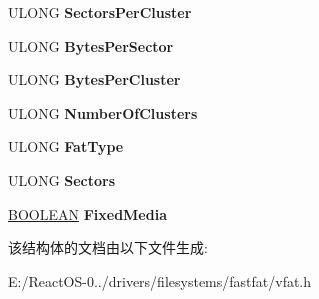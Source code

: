 \begin{DoxyCompactItemize}
\item 
\mbox{\label{struct_f_a_t_i_n_f_o_ac29036db23fe1c0f4ef92f9d8b02137f}} 
U\+L\+O\+NG {\bfseries Sectors\+Per\+Cluster}
\item 
\mbox{\label{struct_f_a_t_i_n_f_o_a7ca6b8360610f1c316be03724b19ccae}} 
U\+L\+O\+NG {\bfseries Bytes\+Per\+Sector}
\item 
\mbox{\label{struct_f_a_t_i_n_f_o_aa3f35d1355ea4a731d3ff1ace17b03fe}} 
U\+L\+O\+NG {\bfseries Bytes\+Per\+Cluster}
\item 
\mbox{\label{struct_f_a_t_i_n_f_o_ae32bded69d8444e03577fc22e167f865}} 
U\+L\+O\+NG {\bfseries Number\+Of\+Clusters}
\item 
\mbox{\label{struct_f_a_t_i_n_f_o_ae695c89deef74a94ef03131bb20622c2}} 
U\+L\+O\+NG {\bfseries Fat\+Type}
\item 
\mbox{\label{struct_f_a_t_i_n_f_o_a14278ee350453ef3f0ad6a92a738acee}} 
U\+L\+O\+NG {\bfseries Sectors}
\item 
\mbox{\label{struct_f_a_t_i_n_f_o_a6b16f595140a30ad11382253097f6c35}} 
\hyperlink{_processor_bind_8h_a112e3146cb38b6ee95e64d85842e380a}{B\+O\+O\+L\+E\+AN} {\bfseries Fixed\+Media}
\end{DoxyCompactItemize}


该结构体的文档由以下文件生成\+:\begin{DoxyCompactItemize}
\item 
E\+:/\+React\+O\+S-\/0../drivers/filesystems/fastfat/vfat.\+h\end{DoxyCompactItemize}
